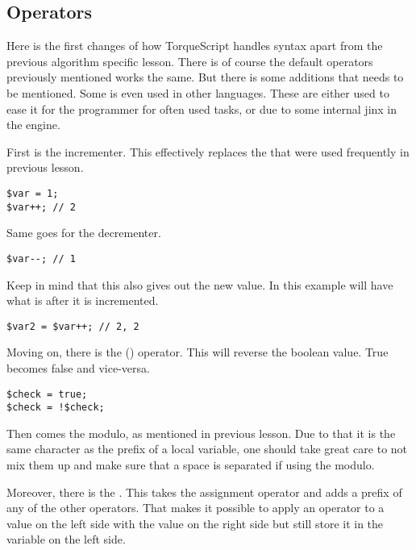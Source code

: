 \subsection{Operators}

Here is the first changes of how TorqueScript handles syntax apart from the previous algorithm specific lesson. There is of course the default operators previously mentioned works the same. But there is some additions that needs to be mentioned. Some is even used in other languages. These are either used to ease it for the programmer for often used tasks, or due to some internal jinx in the engine.

First is the incrementer. This effectively replaces the  that were used frequently in previous lesson.

\begin{lstlisting}[style=ts]
$var = 1;
$var++; // 2
\end{lstlisting}

Same goes for the decrementer.

\begin{lstlisting}[style=ts]
$var--; // 1
\end{lstlisting}

Keep in mind that this also gives out the new value. In this example  will have what  is after it is incremented.

\begin{lstlisting}[style=ts]
$var2 = $var++; // 2, 2
\end{lstlisting}

Moving on, there is the  (\code{!}) operator. This will reverse the boolean value. True becomes false and vice-versa.

\begin{lstlisting}[style=ts]
$check = true;
$check = !$check;
\end{lstlisting}

Then comes the modulo, as mentioned in previous lesson. Due to that it is the same character as the prefix of a local variable, one should take great care to not mix them up and make sure that a space is separated if using the modulo.

Moreover, there is the . This takes the assignment operator and adds a prefix of any of the other operators. That makes it possible to apply an operator to a value on the left side with the value on the right side but still store it in the variable on the left side.

